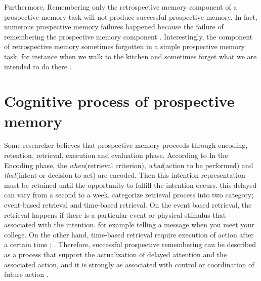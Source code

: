 Furthermore, Remembering only the retrospective memory component of a prospective memory task will not produce successful prospective memory. In fact, numerous prospective memory failures happened because the failure of remembering the prospective memory component
\citep{einsteindGuynn1992}. Interestingly, the component of retrospective memory sometimes forgotten in a simple prospective memory task, for instance when we walk to the kitchen and sometimes forget what we are intended to do there \citep{brandimonte1996prospective}.


\section{Cognitive process of prospective memory}


Some researcher believes that prospective memory proceeds  through encoding, retention, retrieval, execution and evaluation phase.
According to \cite{inside1996prospective} In the Encoding phase, the \textit{when}(retrieval criterion), \textit{what}(action to be performed) and \textit{that}(intent or decision to act) are encoded. Then this intention representation must be retained until the opportunity to fulfill the intention occurs. this delayed can vary from a second to a week. \cite{EinsteinGillesO.1990NAaP} categorize  retrieval process into two category;
event-based retrieval and time-based retrieval. On the event based retrieval, the retrieval happens if there is a particular event or physical stimulus that associated with the intention. for example telling a message when you meet your college. On the other hand, time-based retrieval require execution of action after a certain time  \citep{inside1996prospective};   \citep{Mcgann2002}.
Therefore, successful prospective remembering can be described as a process that support the actualization of delayed attention and the associated action, and it is strongly as associated with control or coordination of future action \citep{inside1996prospective}.

